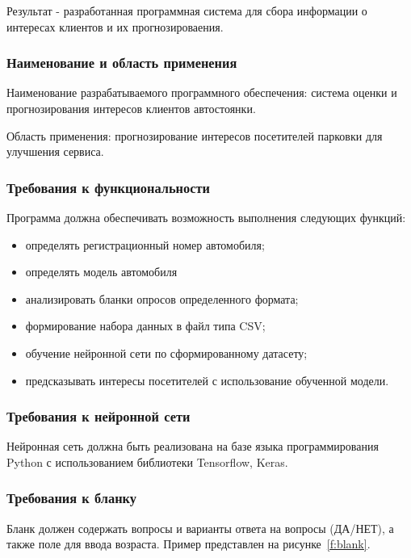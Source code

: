 Результат - разработанная программная система для сбора информации о интересах клиентов и их прогнозироваения. 

\subsubsection{Наименование и область применения}

Наименование разрабатываемого программного обеспечения: система оценки и прогнозирования интересов клиентов автостоянки. 

Область применения: прогнозирование интересов посетителей парковки для улучшения сервиса.


\subsubsection{Требования к функциональности}

Программа должна обеспечивать возможность выполнения следующих функций:

\begin{itemize}
	\item определять регистрационный номер автомобиля;
	\item определять модель автомобиля
	\item анализировать бланки опросов определенного формата;
	\item формирование набора данных в файл типа CSV;
	\item обучение нейронной сети по сформированному датасету;
	\item предсказывать интересы посетителей с использование обученной модели.
\end{itemize}


\subsubsection{Требования к нейронной сети}

Нейронная сеть должна быть реализована на базе языка программирования Python с использованием библиотеки Tensorflow, Keras.


\subsubsection{Требования к бланку}

Бланк должен содержать вопросы и варианты ответа на вопросы (ДА/НЕТ), а также поле для ввода возраста. Пример представлен на рисунке~\ref{f:blank}.


